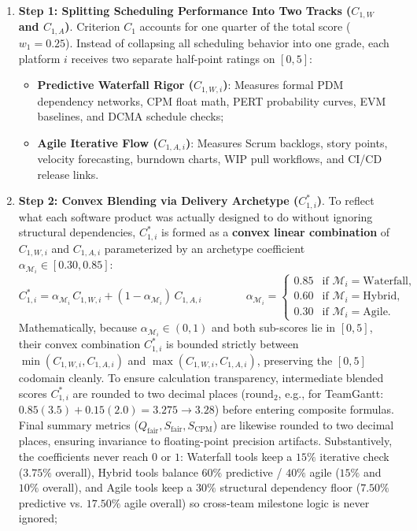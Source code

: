 \begin{enumerate}[leftmargin=2.2em,labelsep=0.5em,itemsep=1.5pt,topsep=1pt]
\setlength{\abovedisplayskip}{4pt}
\setlength{\belowdisplayskip}{4pt}
    \item \textbf{Step 1: Splitting Scheduling Performance Into Two Tracks ($C_{1,W}$ and $C_{1,A}$)}. Criterion $C_1$ accounts for one quarter of the total score ($w_1 = 0.25$). Instead of collapsing all scheduling behavior into one grade, each platform $i$ receives two separate half-point ratings on $[0, 5]$:
    \begin{itemize}[itemsep=1pt,topsep=1pt]
        \item \textbf{Predictive Waterfall Rigor ($C_{1,W,i}$)}: Measures formal PDM dependency networks, CPM float math, PERT probability curves, EVM baselines, and DCMA schedule checks;
        \item \textbf{Agile Iterative Flow ($C_{1,A,i}$)}: Measures Scrum backlogs, story points, velocity forecasting, burndown charts, WIP pull workflows, and CI/CD release links.
    \end{itemize}
	\newpage
    \item \textbf{Step 2: Convex Blending via Delivery Archetype ($C_{1,i}^*$)}. To reflect what each software product was actually designed to do without ignoring structural dependencies, $C_{1,i}^*$ is formed as a \textbf{convex linear combination} of $C_{1,W,i}$ and $C_{1,A,i}$ parameterized by an archetype coefficient $\alpha_{\mathcal{M}_i} \in [0.30, 0.85]$:
    $$
        C_{1,i}^* = \alpha_{\mathcal{M}_i}\, C_{1,W,i} + (1 - \alpha_{\mathcal{M}_i})\, C_{1,A,i} \qquad \qquad
        \alpha_{\mathcal{M}_i} = \begin{cases}
            0.85 & \text{if } \mathcal{M}_i = \text{Waterfall,} \\
            0.60 & \text{if } \mathcal{M}_i = \text{Hybrid,} \\
            0.30 & \text{if } \mathcal{M}_i = \text{Agile.}
        \end{cases}
    $$
    Mathematically, because $\alpha_{\mathcal{M}_i} \in (0, 1)$ and both sub-scores lie in $[0, 5]$, their convex combination $C_{1,i}^*$ is bounded strictly between $\min(C_{1,W,i}, C_{1,A,i})$ and $\max(C_{1,W,i}, C_{1,A,i})$, preserving the $[0, 5]$ codomain cleanly. To ensure calculation transparency, intermediate blended scores $C_{1,i}^*$ are rounded to two decimal places ($\text{round}_2$, e.g., for TeamGantt: $0.85(3.5) + 0.15(2.0) = 3.275 \to \mathbf{3.28}$) before entering composite formulas. Final summary metrics ($Q_{\text{fair}}, S_{\text{fair}}, S_{\text{CPM}}$) are likewise rounded to two decimal places, ensuring invariance to floating-point precision artifacts. Substantively, the coefficients never reach $0$ or $1$: Waterfall tools keep a $15\%$ iterative check ($3.75\%$ overall), Hybrid tools balance $60\%$ predictive / $40\%$ agile ($15\%$ and $10\%$ overall), and Agile tools keep a $30\%$ structural dependency floor ($7.50\%$ predictive vs. $17.50\%$ agile overall) so cross-team milestone logic is never ignored;


\end{enumerate}
